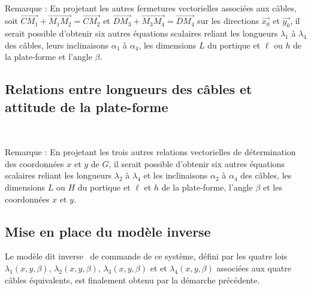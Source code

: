 ~\

Remarque : En projetant les autres fermetures vectorielles associées aux câbles, soit $\overrightarrow{CM_1}+\overrightarrow{M_1M_2}=\overrightarrow{CM_2}$ et $\overrightarrow{DM_3}+\overrightarrow{M_3M_4}=\overrightarrow{DM_4}$ sur les directions $\vec{x_0}$ et $\vec{y_0}$, il serait possible d’obtenir six autres équations scalaires reliant les longueurs $\lambda_1$ à $\lambda_4$ des câbles, leurs inclinaisons $\alpha_1$ à $\alpha_4$, les dimensions $L$ du portique et $\ell$ ou $h$ de la plate-forme et l’angle $\beta$.

\subsection{Relations entre longueurs des câbles et attitude de la plate-forme}


~\

Remarque : En projetant les trois autres relations vectorielles de détermination des coordonnées $x$ et $y$ de $G$, il serait possible d’obtenir six autres équations scalaires reliant les longueurs $\lambda_2$ à $\lambda_4$ et les inclinaisons $\alpha_2$ à $\alpha_4$ des câbles, les dimensions $L$ ou $H$ du portique et $\ell$ et $h$ de la plate-forme, l’angle $\beta$ et les coordonnées $x$ et $y$.

\subsection{Mise en place du modèle inverse}

Le modèle dit \og inverse \fg\ de commande de ce système, défini par les quatre lois $\lambda_1(x,y,\beta)$, $\lambda_2(x,y,\beta)$, $\lambda_3(x,y,\beta)$ et 
et $\lambda_4(x,y,\beta)$ associées aux quatre câbles équivalents, est finalement obtenu par la démarche précédente.

